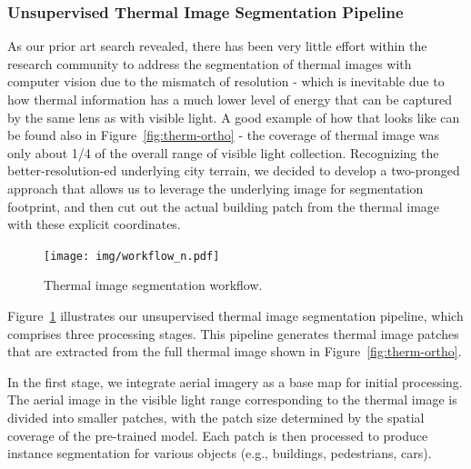 \documentclass[preprint,12pt]{elsarticle}
\begin{document}
    \subsubsection{Unsupervised Thermal Image Segmentation Pipeline}
        As our prior art search revealed, there has been very little effort within the research community to address the segmentation of thermal images with computer vision  due to the mismatch of resolution - which is inevitable due to how thermal information has a much lower level of energy that can be captured by the same lens as with visible light. A good example of how that looks like can be found also in Figure~\ref{fig:therm-ortho} - the coverage of thermal image was only about 1/4 of the overall range of visible light collection. Recognizing the better-resolution-ed underlying city terrain, we decided to develop a two-pronged approach that allows us to leverage the underlying image for segmentation footprint, and then cut out the actual building patch from the thermal image with these explicit coordinates.


       \begin{figure}[h]
            \centering
            \texttt{[image: img/workflow\_n.pdf]}
            \caption{Thermal image segmentation workflow.}
            \label{fig:thermseg-workflow}
        \end{figure}

    Figure~\ref{fig:thermseg-workflow} illustrates our unsupervised thermal image segmentation pipeline, which comprises three processing stages. This pipeline generates thermal image patches that are extracted from the full thermal image shown in Figure~\ref{fig:therm-ortho}.
    
    In the first stage, we integrate aerial imagery as a base map for initial processing. The aerial image in the visible light range corresponding to the thermal image is divided into smaller patches, with the patch size determined by the spatial coverage of the pre-trained model. Each patch is then processed to produce instance segmentation for various objects (e.g., buildings, pedestrians, cars).
    
\end{document}
